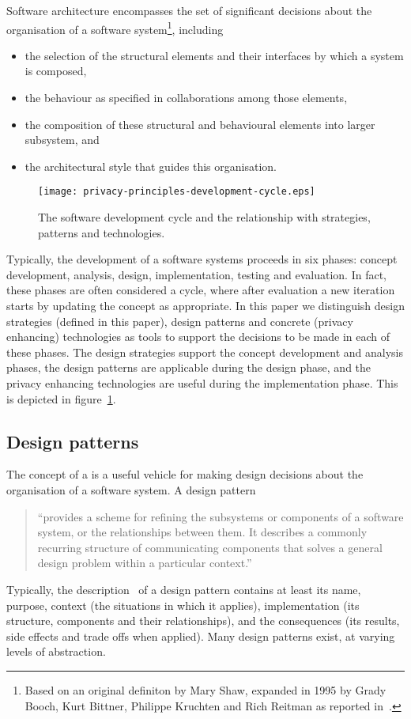 Software architecture encompasses the set of significant decisions about the organisation of a software system\footnote{Based on an original definiton by Mary Shaw, expanded in 1995 by Grady
  Booch, Kurt Bittner, Philippe Kruchten and Rich Reitman as reported
  in~\cite{kruchten2004ontology}.
}, 
including
\begin{itemize}
\item the selection of the structural elements and their interfaces by which a
   system is composed,
\item the behaviour as specified in collaborations among those elements,
\item the composition of these structural and behavioural elements into larger
    subsystem, and
\item the architectural style that guides this organisation.
\end{itemize}


\begin{figure}[t]
\begin{center}
\texttt{[image: privacy-principles-development-cycle.eps]}
\end{center}
\caption{The software development cycle and the relationship with strategies, patterns and technologies.}
\label{fig-cycle}
\end{figure}

Typically, the development of a software systems proceeds in six phases: concept development, analysis, design, implementation, testing and evaluation. In fact, these phases are often considered a cycle, where after evaluation a new iteration starts by updating the concept as appropriate.
In this paper we distinguish design strategies (defined in this paper), design patterns and concrete (privacy enhancing) technologies as tools to support the decisions to be made in each of these phases. The design strategies support the concept development and analysis phases, the design patterns are applicable during the design phase, and the privacy enhancing technologies are useful during the implementation phase. This is depicted in figure~\ref{fig-cycle}.

\subsection{Design patterns}

The concept of a  is a useful vehicle for making design  decisions about the organisation of a software system. A design pattern
\begin{quote}
``provides a scheme for refining the subsystems or components of a software system, or the relationships between them. It describes a commonly recurring structure of communicating components that solves a general design problem within a particular context.''~\cite{buschmann1996patterns} 
\end{quote}
Typically, the description~\cite{gamma1994design-patterns} of a design pattern contains at least its name, purpose, context (the situations in which it applies), implementation (its structure, components and their relationships), and the consequences (its results, side effects and trade offs when applied). Many design patterns exist, at varying levels of abstraction. 

